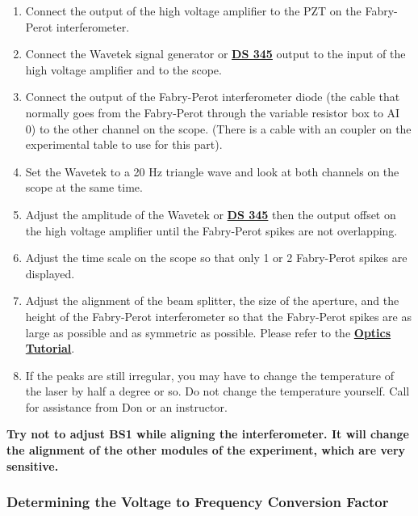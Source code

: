 \documentclass{../lab}
\begin{document}
\begin{enumerate}
    \item Connect the output of the high voltage amplifier to the PZT on the Fabry-Perot interferometer.

    \item Connect the Wavetek signal generator or \href{https://youtu.be/PrM8DHFOFS0}{\textbf{DS 345}} output to the input of the high voltage amplifier and to the scope.

    \item Connect the output of the Fabry-Perot interferometer diode (the cable that normally goes from the Fabry-Perot through the variable resistor box to AI 0) to the other channel on the scope. (There is a cable with an coupler on the experimental table to use for this part).

    \item Set the Wavetek to a 20 Hz triangle wave and look at both channels on the scope at the same time.

    \item Adjust the amplitude of the Wavetek or \href{https://youtu.be/PrM8DHFOFS0}{\textbf{\textbf{DS 345}}} then  the output offset on the high voltage amplifier until the Fabry-Perot spikes are not overlapping.

    \item Adjust the time scale on the scope so that only 1 or 2 Fabry-Perot spikes are displayed.

    \item Adjust the alignment of the beam splitter, the size of the aperture, and the height of the Fabry-Perot interferometer so that the Fabry-Perot spikes are as large as possible and as symmetric as possible. Please refer to the \href{https://berkeley-physics111b.github.io/appendices/OpticsTutorial/}{\textbf{Optics Tutorial}}.

    \item If the peaks are still irregular, you may have to change the temperature of the laser by half a degree or so. Do not change the temperature yourself. Call for assistance from Don or an instructor.

\end{enumerate}

\textbf{Try not to adjust BS1 while aligning the interferometer. It will change the alignment of the other modules of the experiment, which are very sensitive.}

\subsubsection{Determining the Voltage to Frequency Conversion Factor}
\end{document}
